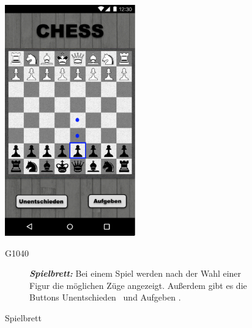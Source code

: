 \documentclass[parskip=full]{scrartcl}
\begin{document}
\begin{figure}[htp]
	\begin{minipage}[t]{6cm}
		\vspace{0pt}
		\includegraphics[height=100mm]{ingame.png}
		\caption{Spielbrett}
		\label{fig:Spielbrett}
	\end{minipage}
	\hfill
	\begin{minipage}[t]{6cm}
		\vspace{0pt}
		\begin{description}
			\item[G1040] \textbf{\textit{Spielbrett: }} Bei einem Spiel werden nach der Wahl einer Figur die möglichen Züge angezeigt. Außerdem gibt es die Buttons \glqq Unentschieden \grqq\ und \glqq Aufgeben \grqq.
		\end{description}
	\end{minipage}
\end{figure}
\end{document}
